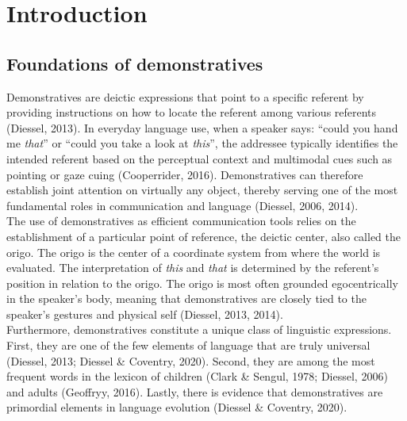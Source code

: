 \documentclass[11pt, a4paper]{article}
\begin{document}
\newpage

\section{Introduction}

\subsection{Foundations of demonstratives}
Demonstratives are deictic expressions that point to a specific referent by providing instructions on how to locate the referent among various referents (Diessel, 2013). In everyday language use, when a speaker says: “could you hand me \textit{that}” or “could you take a look at \textit{this}”, the addressee typically  identifies the intended referent based on the perceptual context and multimodal cues such as pointing or gaze cuing (Cooperrider, 2016). Demonstratives can therefore establish joint attention on virtually any object, thereby serving one of the most fundamental roles in communication and language (Diessel, 2006, 2014).\\

The use of demonstratives as efficient communication tools relies on the establishment of a particular point of reference, the deictic center, also called the origo. The origo is the center of a coordinate system from where the world is evaluated. The interpretation of \textit{this} and \textit{that} is determined by the referent’s position in relation to the origo. The origo is most often grounded egocentrically in the speaker’s body, meaning that demonstratives are closely tied to the speaker’s gestures and physical self (Diessel, 2013, 2014). \\

Furthermore, demonstratives constitute a unique class of linguistic expressions. First, they are one of the few elements of language that are truly universal (Diessel, 2013; Diessel \& Coventry, 2020). Second, they are among the most frequent words in the lexicon of children (Clark \& Sengul, 1978; Diessel, 2006) and adults (Geoffryy, 2016). Lastly, there is evidence that demonstratives are primordial elements in language evolution (Diessel \& Coventry, 2020).
\end{document}
